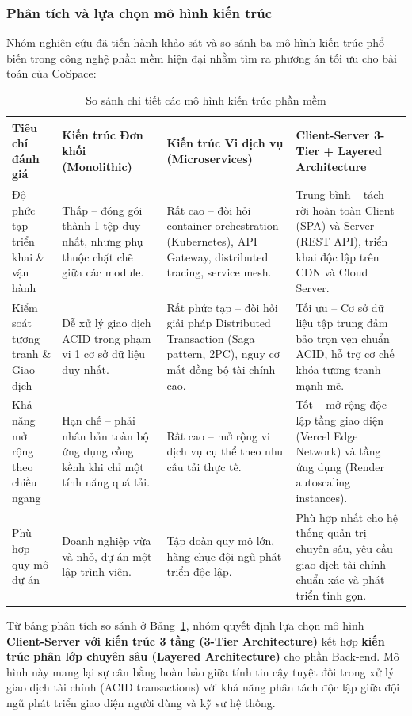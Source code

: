 \subsubsection{Phân tích và lựa chọn mô hình kiến trúc}

Nhóm nghiên cứu đã tiến hành khảo sát và so sánh ba mô hình kiến trúc phổ biến trong công nghệ phần mềm hiện đại nhằm tìm ra phương án tối ưu cho bài toán của CoSpace:

\begin{table}[H]
\centering
\caption{So sánh chi tiết các mô hình kiến trúc phần mềm}
\label{tab:architecture-comparison}
\renewcommand{\arraystretch}{1.3}
\begin{tabular}{|p{3.2cm}|p{3.6cm}|p{3.6cm}|p{3.6cm}|}
\hline
\textbf{Tiêu chí đánh giá} & \textbf{Kiến trúc Đơn khối (Monolithic)} & \textbf{Kiến trúc Vi dịch vụ (Microservices)} & \textbf{Client-Server 3-Tier + Layered Architecture} \\
\hline
Độ phức tạp triển khai \& vận hành & Thấp -- đóng gói thành 1 tệp duy nhất, nhưng phụ thuộc chặt chẽ giữa các module. & Rất cao -- đòi hỏi container orchestration (Kubernetes), API Gateway, distributed tracing, service mesh. & Trung bình -- tách rời hoàn toàn Client (SPA) và Server (REST API), triển khai độc lập trên CDN và Cloud Server. \\
\hline
Kiểm soát tương tranh \& Giao dịch & Dễ xử lý giao dịch ACID trong phạm vi 1 cơ sở dữ liệu duy nhất. & Rất phức tạp -- đòi hỏi giải pháp Distributed Transaction (Saga pattern, 2PC), nguy cơ mất đồng bộ tài chính cao. & Tối ưu -- Cơ sở dữ liệu tập trung đảm bảo trọn vẹn chuẩn ACID, hỗ trợ cơ chế khóa tương tranh mạnh mẽ. \\
\hline
Khả năng mở rộng theo chiều ngang & Hạn chế -- phải nhân bản toàn bộ ứng dụng cồng kềnh khi chỉ một tính năng quá tải. & Rất cao -- mở rộng vi dịch vụ cụ thể theo nhu cầu tải thực tế. & Tốt -- mở rộng độc lập tầng giao diện (Vercel Edge Network) và tầng ứng dụng (Render autoscaling instances). \\
\hline
Phù hợp quy mô dự án & Doanh nghiệp vừa và nhỏ, dự án một lập trình viên. & Tập đoàn quy mô lớn, hàng chục đội ngũ phát triển độc lập. & Phù hợp nhất cho hệ thống quản trị chuyên sâu, yêu cầu giao dịch tài chính chuẩn xác và phát triển tinh gọn. \\
\hline
\end{tabular}
\end{table}

Từ bảng phân tích so sánh ở Bảng~\ref{tab:architecture-comparison}, nhóm quyết định lựa chọn mô hình \textbf{Client-Server với kiến trúc 3 tầng (3-Tier Architecture)} kết hợp \textbf{kiến trúc phân lớp chuyên sâu (Layered Architecture)} cho phần Back-end. Mô hình này mang lại sự cân bằng hoàn hảo giữa tính tin cậy tuyệt đối trong xử lý giao dịch tài chính (ACID transactions) với khả năng phân tách độc lập giữa đội ngũ phát triển giao diện người dùng và kỹ sư hệ thống.

